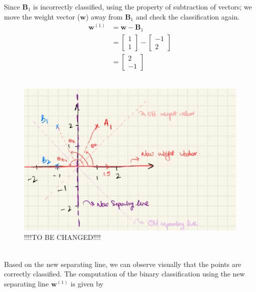 Since $\textbf{B}_1$ is incorrectly classified, using the property of subtraction of vectors; we move the weight vector ($\textbf{w}$) away from $\textbf{B}_1$ and check the classification again.
\begin{align}
  \textbf{w}^{(1)} &= \textbf{w} - \textbf{B}_1 \\
  &= \begin{bmatrix}
    1 \\
    1
  \end{bmatrix} - \begin{bmatrix}
    -1 \\
    2
  \end{bmatrix} \\
  & = \begin{bmatrix}
    2 \\
    -1
  \end{bmatrix}
\end{align}\\
\begin{figure}[ht]
  \centering
  \includegraphics[scale=0.15]{CHAPTER_2/c2_fig_perceptron_example_4.jpeg}
  \caption{!!!!TO BE CHANGED!!!!}
  \label{fig:perceptron_example_4}
\end{figure} \\
Based on the new separating line, we can observe visually that the points are correctly classified. The computation of the binary classification using the new separating line $\textbf{w}^{(1)}$ is given by
